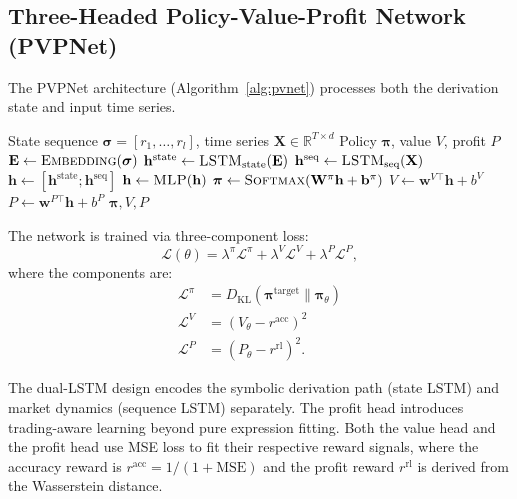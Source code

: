 \subsection{Three-Headed Policy-Value-Profit Network (PVPNet)}
\label{subsec:pvnet}

The PVPNet architecture (Algorithm~\ref{alg:pvnet}) processes both the derivation state and input time series.

\begin{algorithm}[htbp]
\caption{PVPNet Forward Pass}
\label{alg:pvnet}
\begin{algorithmic}[1]
\Require State sequence $\boldsymbol{\sigma} = [r_1, \ldots, r_l]$, time series $\mathbf{X} \in \mathbb{R}^{T \times d}$
\Ensure Policy $\boldsymbol{\pi}$, value $V$, profit $P$
\State $\mathbf{E} \leftarrow \textsc{Embedding}(\boldsymbol{\sigma})$ 
\State $\mathbf{h}^{\text{state}} \leftarrow \textsc{LSTM}_{\text{state}}(\mathbf{E})$ 
\State $\mathbf{h}^{\text{seq}} \leftarrow \textsc{LSTM}_{\text{seq}}(\mathbf{X})$ 
\State $\mathbf{h} \leftarrow [\mathbf{h}^{\text{state}}; \mathbf{h}^{\text{seq}}]$ 
\State $\mathbf{h} \leftarrow \textsc{MLP}(\mathbf{h})$ 
\State $\boldsymbol{\pi} \leftarrow \textsc{Softmax}(\mathbf{W}^{\pi}\mathbf{h} + \mathbf{b}^{\pi})$
\State $V \leftarrow \mathbf{w}^{V \top}\mathbf{h} + b^{V}$
\State $P \leftarrow \mathbf{w}^{P \top}\mathbf{h} + b^{P}$
\State \Return $\boldsymbol{\pi}, V, P$
\end{algorithmic}
\end{algorithm}

The network is trained via three-component loss:
\begin{equation}
\mathcal{L}(\theta) = \lambda^{\pi} \mathcal{L}^{\pi} + \lambda^{V} \mathcal{L}^{V} + \lambda^{P} \mathcal{L}^{P},
\label{eq:loss}
\end{equation}
where the components are:
\begin{align}
\mathcal{L}^{\pi} &= D_{\text{KL}}(\boldsymbol{\pi}^{\text{target}} \| \boldsymbol{\pi}_{\theta}) \label{eq:loss_policy}\\
\mathcal{L}^{V} &= \left(V_{\theta} - r^{\text{acc}}\right)^{2} \label{eq:loss_value}\\
\mathcal{L}^{P} &= \left(P_{\theta} - r^{\text{rl}}\right)^{2}. \label{eq:loss_profit}
\end{align}

The dual-LSTM design encodes the symbolic derivation path (state LSTM) and market dynamics (sequence LSTM) separately. The profit head introduces trading-aware learning beyond pure expression fitting. Both the value head and the profit head use MSE loss to fit their respective reward signals, where the accuracy reward is $r^{\text{acc}} = 1/(1+\text{MSE})$ and the profit reward $r^{\text{rl}}$ is derived from the Wasserstein distance.

